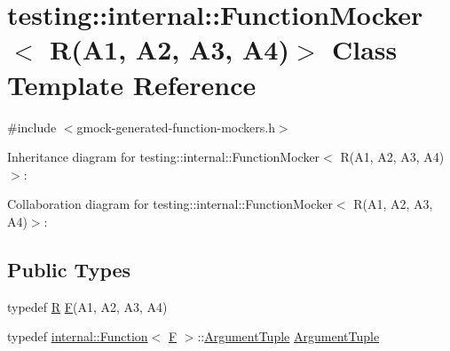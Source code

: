 \hypertarget{classtesting_1_1internal_1_1_function_mocker_3_01_r_07_a1_00_01_a2_00_01_a3_00_01_a4_08_4}{}\section{testing\+:\+:internal\+:\+:Function\+Mocker$<$ R(A1, A2, A3, A4)$>$ Class Template Reference}
\label{classtesting_1_1internal_1_1_function_mocker_3_01_r_07_a1_00_01_a2_00_01_a3_00_01_a4_08_4}


{\ttfamily \#include $<$gmock-\/generated-\/function-\/mockers.\+h$>$}



Inheritance diagram for testing\+:\+:internal\+:\+:Function\+Mocker$<$ R(A1, A2, A3, A4)$>$\+:


Collaboration diagram for testing\+:\+:internal\+:\+:Function\+Mocker$<$ R(A1, A2, A3, A4)$>$\+:
\subsection*{Public Types}
\begin{DoxyCompactItemize}
\item 
typedef \hyperlink{typedefs__9_8js_afb423b73ee7b6c04d2d54fc06e405404}{R} \hyperlink{classtesting_1_1internal_1_1_function_mocker_3_01_r_07_a1_00_01_a2_00_01_a3_00_01_a4_08_4_a9be04bb962edb1458c857ca8e9db9318}{F}(A1, A2, A3, A4)
\item 
typedef \hyperlink{structtesting_1_1internal_1_1_function}{internal\+::\+Function}$<$ \hyperlink{classtesting_1_1internal_1_1_function_mocker_3_01_r_07_a1_00_01_a2_00_01_a3_00_01_a4_08_4_a9be04bb962edb1458c857ca8e9db9318}{F} $>$\+::\hyperlink{classtesting_1_1internal_1_1_function_mocker_3_01_r_07_a1_00_01_a2_00_01_a3_00_01_a4_08_4_a97576d71dfe85cbb0fc51fcaad6d4cc1}{Argument\+Tuple} \hyperlink{classtesting_1_1internal_1_1_function_mocker_3_01_r_07_a1_00_01_a2_00_01_a3_00_01_a4_08_4_a97576d71dfe85cbb0fc51fcaad6d4cc1}{Argument\+Tuple}
\end{DoxyCompactItemize}

